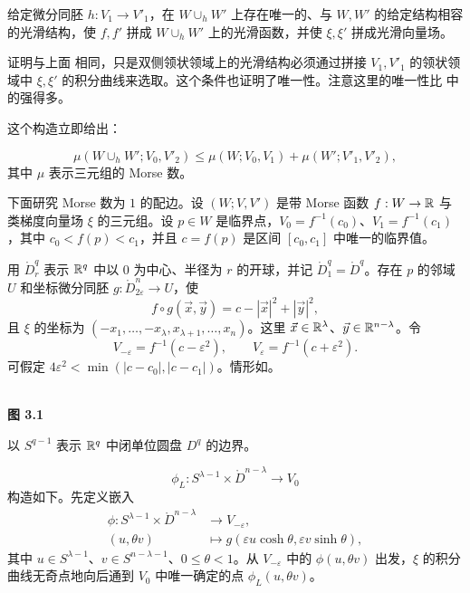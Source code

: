 给定微分同胚 $h:V_1\to V'_1$，在 $W\cup_hW'$ 上存在唯一的、与 $W,W'$ 的给定结构相容的光滑结构，使 $f,f'$ 拼成 $W\cup_hW'$ 上的光滑函数，并使 $\xi,\xi'$ 拼成光滑向量场。

\Proof 证明与上面 相同，只是双侧领状领域上的光滑结构必须通过拼接 $V_1,V'_1$ 的领状领域中 $\xi,\xi'$ 的积分曲线来选取。这个条件也证明了唯一性。注意这里的唯一性比 中的强得多。
\EndProof

这个构造立即给出：

\[
 \mu(W\cup_hW';V_0,V'_2)
 \leq \mu(W;V_0,V_1)+\mu(W';V'_1,V'_2),
\]
其中 $\mu$ 表示三元组的 Morse 数。

下面研究 Morse 数为 $1$ 的配边。设 $(W;V,V')$ 是带 Morse 函数 $f:W\to\mathbb{R}$ 与类梯度向量场 $\xi$ 的三元组。设 $p\in W$ 是临界点，$V_0=f^{-1}(c_0)$、$V_1=f^{-1}(c_1)$，其中 $c_0<f(p)<c_1$，并且 $c=f(p)$ 是区间 $[c_0,c_1]$ 中唯一的临界值。

用 $\mathring D_r^q$ 表示 $\mathbb{R}^q$ 中以 $0$ 为中心、半径为 $r$ 的开球，并记 $\mathring D_1^q=\mathring D^q$。存在 $p$ 的邻域 $U$ 和坐标微分同胚 $g:\mathring D_{2\varepsilon}^n\to U$，使
\[
 f\circ g(\vec x,\vec y)=c-|\vec x|^2+|\vec y|^2,
\]
且 $\xi$ 的坐标为 $(-x_1,\ldots,-x_\lambda,x_{\lambda+1},\ldots,x_n)$。这里 $\vec x\in\mathbb{R}^\lambda$、$\vec y\in\mathbb{R}^{n-\lambda}$。令
\[
 V_{-\varepsilon}=f^{-1}(c-\varepsilon^2),\qquad
 V_\varepsilon=f^{-1}(c+\varepsilon^2).
\]
可假定 $4\varepsilon^2<\min(|c-c_0|,|c-c_1|)$。情形如。

\begin{center}
 \FigThreeOne\\[-.4em]
  \label{fig:3.1}\textbf{图 3.1}
\end{center}

以 $S^{q-1}$ 表示 $\mathbb{R}^q$ 中闭单位圆盘 $D^q$ 的边界。

\emph{}
\[
  \phi_L:S^{\lambda-1}\times\mathring D^{n-\lambda}\longrightarrow V_0
\]
构造如下。先定义嵌入
\[
\begin{aligned}
 \phi:S^{\lambda-1}\times\mathring D^{n-\lambda}&\longrightarrow V_{-\varepsilon},\\
 (u,\theta v)&\longmapsto g(\varepsilon u\cosh\theta,\varepsilon v\sinh\theta),
\end{aligned}
\]
其中 $u\in S^{\lambda-1}$、$v\in S^{n-\lambda-1}$、$0\leq\theta<1$。从 $V_{-\varepsilon}$ 中的 $\phi(u,\theta v)$ 出发，$\xi$ 的积分曲线无奇点地向后通到 $V_0$ 中唯一确定的点 $\phi_L(u,\theta v)$。

